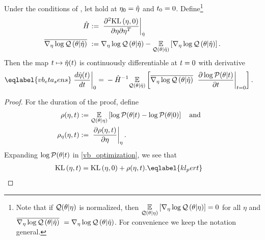 \begin{thm}
%
Under the conditions of , let  hold at $\eta_0 = \hat\eta$ and $t_0 = 0$.
Define\footnote{Note that if $\mathcal{Q}(\theta \vert \eta)$ is normalized, then
$\underset{\mathcal{Q}(\theta \vert \eta)}{\mathbb{E}}\left[{\nabla_\eta \log \mathcal{Q}}\left(\theta \vert \eta\right)\right] = 0$ for all $\eta$
and $\overline{{\nabla_\eta \log \mathcal{Q}}\left(\theta \vert \hat\eta\right)}\,\, = {\nabla_\eta \log \mathcal{Q}}\left(\theta \vert \hat\eta\right)$.  For
convenience we keep the notation general.}
%
\begin{align*}
%
\hessopt :={}& \fracat{\partial^2 \KL{\eta, 0}}
                {\partial \eta \partial \eta^T}
                {\etaopt} \\
\lqgradbar{\theta \vert \etaopt} :={}&
    \lqgrad{\theta \vert \etaopt} -
    \expect{\q(\theta \vert \etaopt)}{\lqgrad{\theta \vert \etaopt}}.
%
\end{align*}
%
Then the map $t \mapsto \hat\eta(t)$ is continuously differentiable at $t=0$
with derivative
%
\begin{align}\eqlabel{vb_eta_sens}
%
\fracat{d \etaopt(\t)}{d \t}{0} ={}&
    - \hessopt^{-1}
    \expect{\q(\theta \vert \etaopt)}{
        \lqgradbar{\theta \vert \etaopt}
        \fracat{\partial \log \p(\theta \vert \t)}{\partial \t}{\t=0}
    }.
%
\end{align}
%
%
\begin{proof}
%
For the duration of the proof, define
%
\begin{align*}
%
\rho(\eta, \t) :={}&
    \expect{\q(\theta \vert \eta)}
           {\log \p(\theta \vert \t) - \log \p(\theta \vert 0)}
\mathand\\
\rho_\eta(\eta, \t) :={}&
\fracat{\partial \rho(\eta, \t)}
       {\partial \eta}{\eta}.
%
\end{align*}
%
Expanding $\log \mathcal{P}(\theta \vert t)$ in \eqref{vb_optimization}, we see that
%
\begin{align}
%
\KL{\eta, \t} ={}&
    \KL{\eta, 0} + \rho(\eta, \t). \eqlabel{kl_pert}
%
\end{align}
%

\end{proof}
\end{thm}
